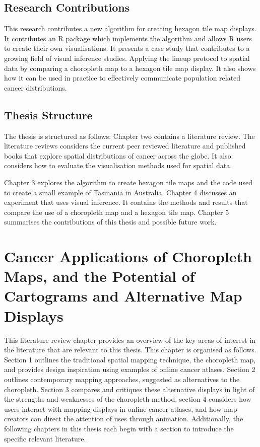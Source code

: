 \documentclass{monashthesis}
\begin{document}
\hypertarget{research-contributions}{%
\section{Research Contributions}\label{research-contributions}}

This research contributes a new algorithm for creating hexagon tile map displays. It contributes an R \autocite{R} package which implements the algorithm and allows R users to create their own visualisations.
It presents a case study that contributes to a growing field of visual inference studies. Applying the lineup protocol to spatial data by comparing a choropleth map to a hexagon tile map display.
It also shows how it can be used in practice to effectively communicate population related cancer distributions.

\hypertarget{thesis-structure}{%
\section{Thesis Structure}\label{thesis-structure}}

The thesis is structured as follows: Chapter two contains a literature review.
The literature reviews considers the current peer reviewed literature and published books that explore spatial distributions of cancer across the globe.
It also considers how to evaluate the visualisation methods used for spatial data.

Chapter 3 explores the algorithm to create hexagon tile maps and the code used to create a small example of Tasmania in Australia.
Chapter 4 discusses an experiment that uses visual inference. It contains the methods and results that compare the use of a choropleth map and a hexagon tile map.
Chapter 5 summarises the contributions of this thesis and possible future work.

\hypertarget{literature}{%
\chapter{Cancer Applications of Choropleth Maps, and the Potential of Cartograms and Alternative Map Displays}\label{literature}}

This literature review chapter provides an overview of the key areas of interest in the literature that are relevant to this thesis. This chapter is organised as follows. Section 1 outlines the traditional spatial mapping technique, the choropleth map, and provides design inspiration using examples of online cancer atlases. Section 2 outlines contemporary mapping approaches, suggested as alternatives to the choropleth. Section 3 compares and critiques these alternative displays in light of the strengths and weaknesses of the choropleth method. section 4 considers how users interact with mapping displays in online cancer atlases, and how map creators can direct the attention of uses through animation. Additionally, the following chapters in this thesis each begin with a section to introduce the specific relevant literature.
\end{document}
